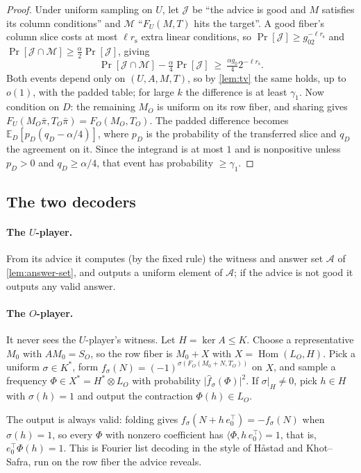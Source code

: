 \documentclass[11pt]{article}
\theoremstyle{definition}
\theoremstyle{remark}
\newcommand{\E}{\mathbb E}
\newcommand{\cA}{\mathcal A}
\newcommand{\rs}{r_{\mathrm s}}
\newcommand{\bpi}{\bar\pi}
\DeclareMathOperator{\Hom}{Hom}
\newcommand{\abs}[1]{\lvert #1\rvert}
\newcommand{\ip}[2]{\langle #1,#2\rangle}
\begin{document}
\begin{proof}
Under uniform sampling on $U$, let $\mathcal J$ be ``the advice is good and $M$
satisfies its column conditions'' and $\mathcal M$ ``$F_U(M,T)$ hits the
target''. A good fiber's column slice costs at most $\ell\rs$ extra linear
conditions, so $\Pr[\mathcal J]\ge g_02^{-\ell\rs}$ and
$\Pr[\mathcal J\cap\mathcal M]\ge\frac\alpha2\Pr[\mathcal J]$, giving
\[
\Pr[\mathcal J\cap\mathcal M]-\tfrac\alpha4\Pr[\mathcal J]\ \ge\ \tfrac{\alpha g_0}{4}2^{-\ell\rs}.
\]
Both events depend only on $(U,A,M,T)$, so by \cref{lem:tv} the same holds, up
to $o(1)$, with the padded table; for large $k$ the difference is at least
$\gamma_1$. Now condition on $D$: the remaining $M_O$ is uniform on its row
fiber, and sharing gives $F_U(M_O\bpi,T_O\bpi)=F_O(M_O,T_O)$. The padded
difference becomes $\E_D[p_D(q_D-\alpha/4)]$, where $p_D$ is the probability of
the transferred slice and $q_D$ the agreement on it. Since the integrand is at
most $1$ and is nonpositive unless $p_D>0$ and $q_D\ge\alpha/4$, that event has
probability $\ge\gamma_1$.
\end{proof}

\subsection{The two decoders}

\paragraph{The $U$-player.} From its advice it computes (by the fixed rule) the
witness and answer set $\cA$ of \cref{lem:answer-set}, and outputs a uniform
element of $\cA$; if the advice is not good it outputs any valid answer.

\paragraph{The $O$-player.} It never sees the $U$-player's witness. Let
$H=\ker A\le K$. Choose a representative $M_0$ with $AM_0=S_O$, so the row
fiber is $M_0+X$ with $X=\Hom(L_O,H)$. Pick a uniform $\sigma\in K^*$, form
$f_\sigma(N)=(-1)^{\sigma(F_O(M_0+N,T_O))}$ on $X$, and sample a frequency
$\Phi\in X^*=H^*\otimes L_O$ with probability $\abs{\widehat f_\sigma(\Phi)}^2$.
If $\sigma|_H\ne0$, pick $h\in H$ with $\sigma(h)=1$ and output the contraction
$\Phi(h)\in L_O$.

The output is always valid: folding gives
$f_\sigma(N+h\,e_0^\top)=-f_\sigma(N)$ when $\sigma(h)=1$, so every $\Phi$ with
nonzero coefficient has $\ip{\Phi}{h\,e_0^\top}=1$, that is,
$e_0^\top\Phi(h)=1$. This is Fourier list decoding in the style of
H{\aa}stad and Khot--Safra, run on the row fiber the advice reveals.
\end{document}
